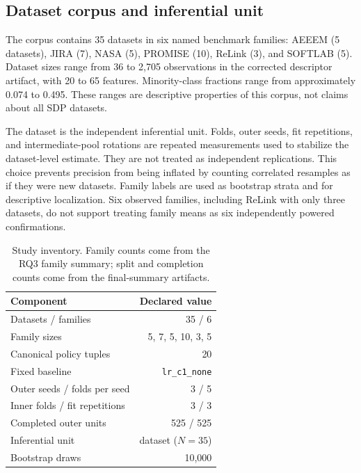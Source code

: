 \documentclass[referee]{USG}
\begin{document}
\subsection{Dataset corpus and inferential unit}
The corpus contains 35 datasets in six named benchmark families: AEEEM (5 datasets), JIRA (7), NASA (5), PROMISE (10), ReLink (3), and SOFTLAB (5). Dataset sizes range from 36 to 2,705 observations in the corrected descriptor artifact, with 20 to 65 features. Minority-class fractions range from approximately 0.074 to 0.495. These ranges are descriptive properties of this corpus, not claims about all SDP datasets.

The dataset is the independent inferential unit. Folds, outer seeds, fit repetitions, and intermediate-pool rotations are repeated measurements used to stabilize the dataset-level estimate. They are not treated as independent replications. This choice prevents precision from being inflated by counting correlated resamples as if they were new datasets. Family labels are used as bootstrap strata and for descriptive localization. Six observed families, including ReLink with only three datasets, do not support treating family means as six independently powered confirmations.

\begin{table}[t]
\caption{Study inventory. Family counts come from the RQ3 family summary; split and completion counts come from the final-summary artifacts.}
\label{tab:inventory}
\centering\small
\begin{tabular}{lr}
\toprule
Component & Declared value\\
\midrule
Datasets / families & 35 / 6\\
Family sizes & 5, 7, 5, 10, 3, 5\\
Canonical policy tuples & 20\\
Fixed baseline & \texttt{lr\_c1\_none}\\
Outer seeds / folds per seed & 3 / 5\\
Inner folds / fit repetitions & 3 / 3\\
Completed outer units & 525 / 525\\
Inferential unit & dataset ($N=35$)\\
Bootstrap draws & 10,000\\
\bottomrule
\end{tabular}
\end{table}
\end{document}
